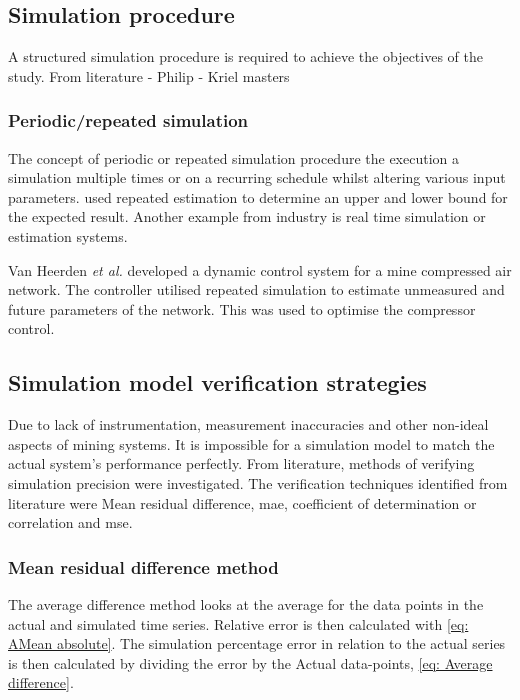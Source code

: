 	\subsection{Simulation procedure}
	A structured simulation procedure is required to achieve the objectives of the study. From literature
		- Philip
		- Kriel masters\\
	\subsubsection{Periodic/repeated simulation}
	The concept of periodic or repeated simulation procedure the execution a simulation multiple times or on a recurring schedule whilst altering various input parameters. \cite{Snyman2011Masters} used repeated estimation to determine an upper and lower bound for the expected result. Another example from industry is real time simulation or estimation systems.
	\par 
	Van Heerden \textit{et al.} \cite{van2014developing} developed a dynamic control system for a mine compressed air network. The controller utilised repeated simulation to estimate unmeasured and future parameters of the network. This was used to optimise the compressor control.
 	\subsection{Simulation model verification strategies}\label{VerificationLit}
 	Due to lack of instrumentation, measurement inaccuracies and other non-ideal aspects of mining systems. It is impossible for a simulation model to match the actual system's performance perfectly. From literature, methods of verifying simulation precision were investigated. The verification techniques identified from literature were Mean residual difference, \gls{mae}, coefficient of determination or correlation and \gls{mse}.%
 		\subsubsection{Mean residual difference method}
 			The average difference method looks at the average for the data points in the actual and simulated time series.  Relative error is then calculated with \cref{eq: AMean absolute}. The simulation percentage error in relation to the actual series is then calculated by dividing the error by the Actual data-points, \cref{eq: Average difference}.
 			
